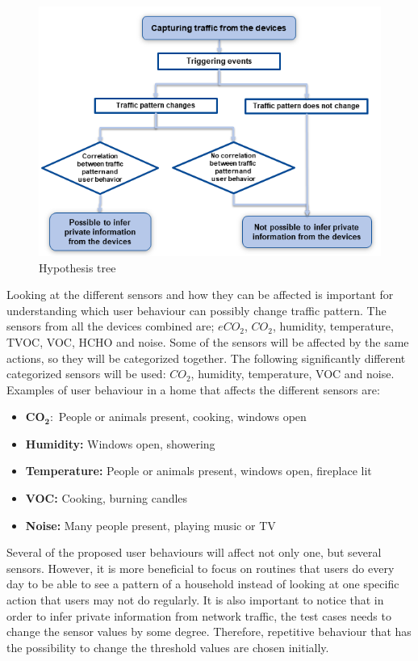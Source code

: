 \begin{figure} [H]
    \includegraphics[width=1\textwidth]{figures/Hypothesistree.png}
    \caption{Hypothesis tree}
    \label{fig:HypothesisTree}
\end{figure}

Looking at the different sensors and how they can be affected is important for understanding which user behaviour can possibly change traffic pattern. The sensors from all the devices combined are; \(eCO_2\), \(CO_2\), humidity, temperature, \gls{TVOC}, \gls{VOC}, HCHO and noise. Some of the sensors will be affected by the same actions, so they will be categorized together. The following significantly different categorized sensors will be used: \(CO_2\), humidity, temperature, VOC and noise. Examples of user behaviour in a home that affects the different sensors are:
\begin{itemize}
    \item $\mathbf{CO_2:}$ People or animals present, cooking, windows open
    \item \textbf{Humidity:} Windows open, showering
    \item \textbf{Temperature:} People or animals present, windows open, fireplace lit
    \item \textbf{VOC:} Cooking, burning candles
    \item \textbf{Noise:} Many people present, playing music or TV
\end{itemize}

Several of the proposed user behaviours will affect not only one, but several sensors. However, it is more beneficial to focus on routines that users do every day to be able to see a pattern of a household instead of looking at one specific action that users may not do regularly. It is also important to notice that in order to infer private information from network traffic, the test cases needs to change the sensor values by some degree. Therefore, repetitive behaviour that has the possibility to change the threshold values are chosen initially. 

